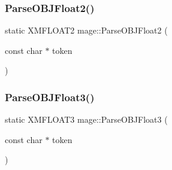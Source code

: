 \subsubsection{\texorpdfstring{Parse\+O\+B\+J\+Float2()}{ParseOBJFloat2()}}
{\footnotesize\ttfamily static X\+M\+F\+L\+O\+A\+T2 mage\+::\+Parse\+O\+B\+J\+Float2 (\begin{DoxyParamCaption}\item[{const char $\ast$}]{token }\end{DoxyParamCaption})\hspace{0.3cm}{\ttfamily [static]}}

\hypertarget{namespacemage_a926f2772c637d2b5c839a936cd8dbdd1}{}\label{namespacemage_a926f2772c637d2b5c839a936cd8dbdd1} 
\subsubsection{\texorpdfstring{Parse\+O\+B\+J\+Float3()}{ParseOBJFloat3()}}
{\footnotesize\ttfamily static X\+M\+F\+L\+O\+A\+T3 mage\+::\+Parse\+O\+B\+J\+Float3 (\begin{DoxyParamCaption}\item[{const char $\ast$}]{token }\end{DoxyParamCaption})\hspace{0.3cm}{\ttfamily [static]}}

\hypertarget{namespacemage_adf2073255065e75868351b15525bde22}{}\label{namespacemage_adf2073255065e75868351b15525bde22} 

